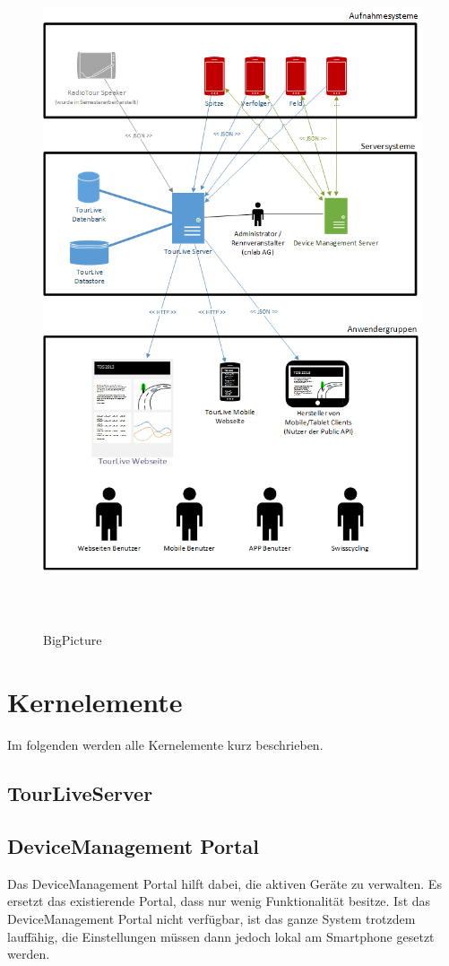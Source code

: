 \begin{figure}[H]
	\centering
	\includegraphics[height=200mm]{images/BigPicture.png}
	\caption{BigPicture}
\end{figure}

\pagebreak

\section{Kernelemente}
Im folgenden werden alle Kernelemente kurz beschrieben.

\subsection{TourLiveServer}

\subsection{DeviceManagement Portal}
Das DeviceManagement Portal hilft dabei, die aktiven Geräte zu verwalten. Es ersetzt das existierende Portal, dass nur wenig Funktionalität besitze. Ist das DeviceManagement Portal nicht verfügbar, ist das ganze System trotzdem lauffähig, die Einstellungen müssen dann jedoch lokal am Smartphone gesetzt werden.

